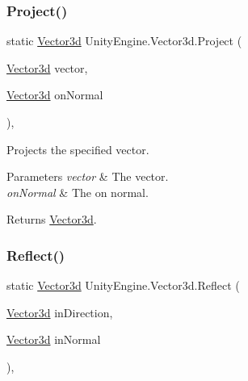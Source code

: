 \subsubsection{\texorpdfstring{Project()}{Project()}}
{\footnotesize\ttfamily static \hyperlink{struct_unity_engine_1_1_vector3d}{Vector3d} Unity\+Engine.\+Vector3d.\+Project (\begin{DoxyParamCaption}\item[{\hyperlink{struct_unity_engine_1_1_vector3d}{Vector3d}}]{vector,  }\item[{\hyperlink{struct_unity_engine_1_1_vector3d}{Vector3d}}]{on\+Normal }\end{DoxyParamCaption})\hspace{0.3cm}{\ttfamily [inline]}, {\ttfamily [static]}}



Projects the specified vector. 


\begin{DoxyParams}{Parameters}
{\em vector} & The vector.\\
\hline
{\em on\+Normal} & The on normal.\\
\hline
\end{DoxyParams}
\begin{DoxyReturn}{Returns}
\hyperlink{struct_unity_engine_1_1_vector3d}{Vector3d}.
\end{DoxyReturn}
\mbox{\label{struct_unity_engine_1_1_vector3d_ab71006fd2f778bade341ba37d3f4e807}} 
\subsubsection{\texorpdfstring{Reflect()}{Reflect()}}
{\footnotesize\ttfamily static \hyperlink{struct_unity_engine_1_1_vector3d}{Vector3d} Unity\+Engine.\+Vector3d.\+Reflect (\begin{DoxyParamCaption}\item[{\hyperlink{struct_unity_engine_1_1_vector3d}{Vector3d}}]{in\+Direction,  }\item[{\hyperlink{struct_unity_engine_1_1_vector3d}{Vector3d}}]{in\+Normal }\end{DoxyParamCaption})\hspace{0.3cm}{\ttfamily [inline]}, {\ttfamily [static]}}



